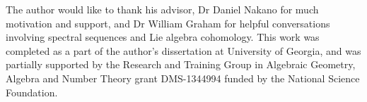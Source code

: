 \documentclass[12pt]{report}
\begin{document}

The author would like to thank his advisor, Dr Daniel Nakano for much motivation and support, and Dr William Graham for helpful conversations involving spectral sequences and Lie algebra cohomology. This work was completed as a part of the author's dissertation at University of Georgia, and was partially supported by the Research and Training Group in Algebraic Geometry, Algebra and Number Theory grant DMS-1344994 funded by the National Science Foundation.











\tableofcontents

\listoffigures   %
\listoftables    %

\newpage
{}  %










{}


\appendices



\end{document}
